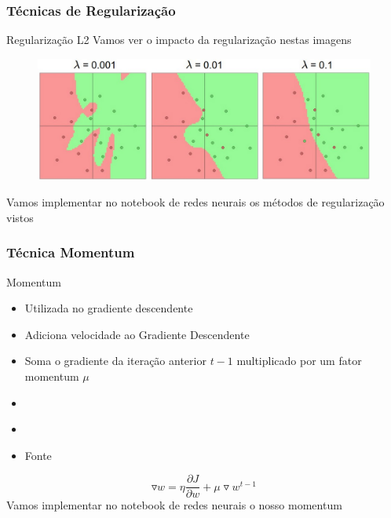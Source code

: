 \documentclass{beamer}
\begin{document}
\begin{frame}
	\frametitle{Técnicas de Regularização}
	\begin{block}{Regularização L2}
		Vamos ver o impacto da regularização nestas imagens
		\begin{figure}
			\centering
			\includegraphics[width=1\linewidth]{figures/comparacao_regularizacao}
		\end{figure}
	Vamos implementar no notebook de redes neurais os métodos de regularização vistos
	\end{block}

\end{frame}
\begin{frame}
	\frametitle{Técnica Momentum}
	\begin{block}{Momentum}
		\begin{itemize}
			\item Utilizada no gradiente descendente
			\item Adiciona velocidade ao Gradiente Descendente
			\item Soma o gradiente da iteração anterior $t-1$ multiplicado por um fator momentum $\mu$
			\item 	\href{https://github.com/mafaldasalomao/pavic_treinamento_ml/blob/main/Machine_Learning/figures/nomomentum1d.gif?raw=true}{}
			\item \href{https://github.com/mafaldasalomao/pavic_treinamento_ml/blob/main/Machine_Learning/figures/momentum1d.gif?raw=true}{}
			\item Fonte \href{https://machinelearningcoban.com/2017/01/16/gradientdescent2/}{}
			
		\end{itemize}
		
		$$\triangledown w = \eta \frac{\partial J}{\partial w} + \mu \triangledown w^{t-1}$$
		Vamos implementar no notebook de redes neurais o nosso momentum
	\end{block}
\end{frame}
\end{document}
